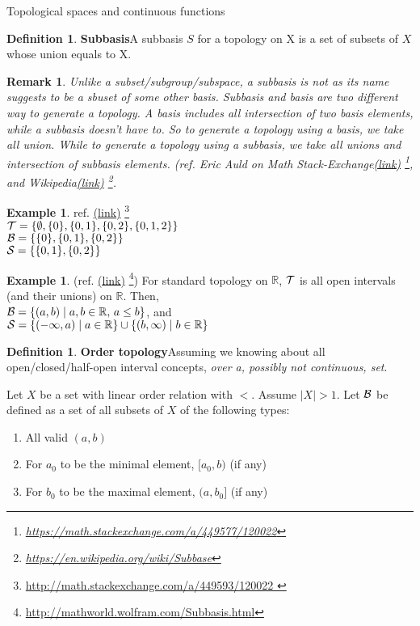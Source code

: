 \documentclass{report}
\newcommand*{\link}[1]{\href{#1}{(\underline{link})}%
  \footnote{\url{#1}}}
\newtheorem*{remark}{Remark}
\theoremstyle{definition}
\newtheorem{definition}[theorem]{Definition}
\newtheorem{example}[theorem]{Example}
\newcommand{\defn}[1]{\textbf{#1}\label{#1}\index{#1}}
\newcommand{\set}[1]{\ensuremath\{#1\}}
\newcommand{\RR}{\mathbb{R}}
\begin{document}
\begin{chapter}{Topological spaces and continuous functions}
  \begin{definition}\defn{Subbasis}
    A subbasis $S$ for a topology on X is a set of subsets of $X$
    whose union equals to X.
  \end{definition}
  \begin{remark}
    Unlike a subset/subgroup/subspace, a subbasis is not as its name
    suggests to be a sbuset of some other basis. Subbasis and basis
    are two different way to generate a topology. A basis includes all
    intersection of two basis elements, while a subbasis doesn't have
    to. So to generate a topology using a basis, we take all
    union. While to generate a topology using a subbasis, we take all
    unions and intersection of subbasis elements. (ref. {Eric Auld on
      Math
      Stack-Exchange\link{https://math.stackexchange.com/a/449577/120022}},
    and Wikipedia\link{https://en.wikipedia.org/wiki/Subbase}.
  \end{remark}
  \begin{example}ref. \link{http://math.stackexchange.com/a/449593/120022
     }\\
    $\T=\set{\emptyset, \set{0}, \set{0,1}, \set{0,2}, \set{0,1,2}}$
    \\
    $\B=\set{\set{0},\set{0,1},\set{0,2}}$ \\
    $\mathcal{S}=\set{\set{0,1},\set{0,2}}$
  \end{example}
  \begin{example}
    (ref. \link{http://mathworld.wolfram.com/Subbasis.html}) For standard topology on $\RR$, $\mathcal{T}$ is all open intervals (and
    their unions) on $\RR$. Then, \\
    $\B=\set{(a,b)\mid a,b\in\RR,\,a\leq b}$, and \\
    $\mathcal{S}=\set{(-\infty,a)\mid
      a\in\RR}\cup\set{(b,\infty)\mid b\in \RR}$ \\

  \end{example}

  \begin{definition}\defn{Order topology}
    Assuming we knowing about all open/closed/half-open interval
    concepts, \emph{over a, possibly not continuous, set}.

    Let $X$ be a set with linear order relation with $<$. Assume
    $|X|>1$. Let $\mathcal{B}$ be defined as a set of all subsets of $X$ of the
    following types:
    \begin{enumerate}
    \item All valid $(a,b)$
    \item For $a_0$ to be the minimal element, $[a_0,b)$ (if any)
    \item For $b_0$ to be the maximal element, $(a,b_0]$ (if any)
    \end{enumerate}


\end{definition}
\end{chapter}
\end{document}
